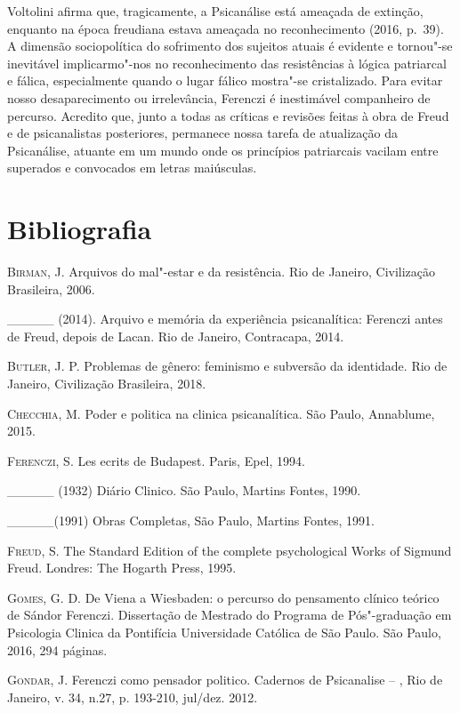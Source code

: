 Voltolini afirma que, tragicamente, a Psicanálise está ameaçada de
extinção, enquanto na época freudiana estava ameaçada no reconhecimento
(2016, p.~39). A dimensão sociopolítica do sofrimento dos sujeitos atuais
é evidente e tornou"-se inevitável implicarmo"-nos no reconhecimento das
resistências à lógica patriarcal e fálica, especialmente quando o lugar
fálico mostra"-se cristalizado. Para evitar nosso desaparecimento ou
irrelevância, Ferenczi é inestimável companheiro de percurso. Acredito
que, junto a todas as críticas e revisões feitas à obra de Freud e de
psicanalistas posteriores, permanece nossa tarefa de atualização da
Psicanálise, atuante em um mundo onde os princípios patriarcais vacilam
entre superados e convocados em letras maiúsculas.

\section{Bibliografia}

\textsc{Birman}, J. Arquivos do mal"-estar e da resistência. Rio de Janeiro,
Civilização Brasileira, 2006.

\_\_\_\_\_ (2014). Arquivo e memória da experiência psicanalítica:
Ferenczi antes de Freud, depois de Lacan. Rio de Janeiro, Contracapa,
2014.

\textsc{Butler}, J. P. Problemas de gênero: feminismo e subversão da identidade.
Rio de Janeiro, Civilização Brasileira, 2018.

\textsc{Checchia}, M. Poder e politica na clinica psicanalítica. São Paulo,
Annablume, 2015.

\textsc{Ferenczi}, S. Les ecrits de Budapest. Paris, Epel, 1994.

\_\_\_\_\_ (1932) Diário Clinico. São Paulo, Martins Fontes, 1990.

\_\_\_\_\_(1991) Obras Completas, São Paulo, Martins Fontes, 1991.

\textsc{Freud}, S. The Standard Edition of the complete psychological Works of
Sigmund Freud. Londres: The Hogarth Press, 1995.

\textsc{Gomes}, G. D. De Viena a Wiesbaden: o percurso do pensamento clínico
teórico de Sándor Ferenczi. Dissertação de Mestrado do Programa de
Pós"-graduação em Psicologia Clinica da Pontifícia Universidade Católica
de São Paulo. São Paulo, 2016, 294 páginas.

\textsc{Gondar}, J. Ferenczi como pensador politico. Cadernos de Psicanalise --
, Rio de Janeiro, v. 34, n.27, p. 193-210, jul/dez. 2012.

